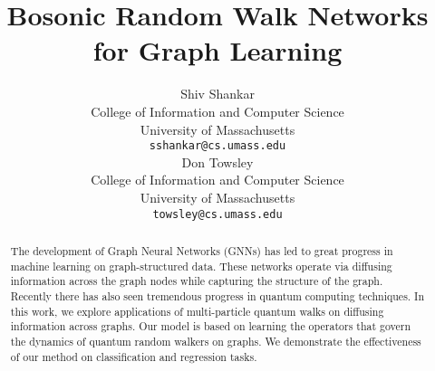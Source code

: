 \documentclass{article}
\title{Bosonic Random Walk Networks for Graph Learning}
\author{%
  Shiv Shankar\\ 
  College of Information and Computer Science\\
  University of Massachusetts\\
  \texttt{sshankar@cs.umass.edu} \\
  \And
  Don Towsley \\
  College of Information and Computer Science\\
  University of Massachusetts\\
  \texttt{towsley@cs.umass.edu} \\
}
\begin{document}
\maketitle

\begin{abstract}


The development of Graph Neural Networks (GNNs) has led to great progress in machine learning on graph-structured data. These networks operate via diffusing information across the graph nodes while capturing the structure of the graph. Recently there has also seen tremendous progress in quantum computing techniques. In this work, we explore applications of multi-particle quantum walks on diffusing information across graphs.
Our model is based on learning the operators that govern the dynamics of quantum random walkers on graphs. We demonstrate the effectiveness of our method on classification and regression tasks.
 


\end{abstract}
\end{document}
